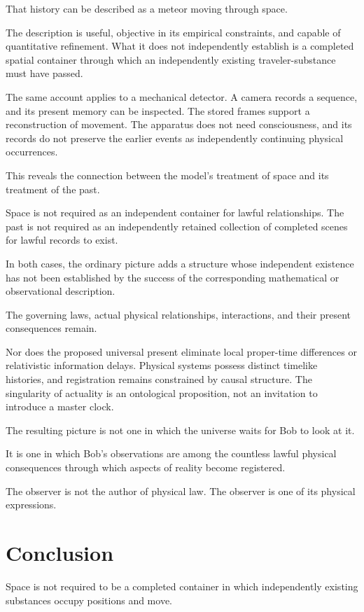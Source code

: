 \documentclass[12pt,onecolumn]{article}
\begin{document}
That history can be described as a meteor moving through space.

The description is useful, objective in its empirical constraints, and capable of quantitative refinement. What it does not independently establish is a completed spatial container through which an independently existing traveler-substance must have passed.

The same account applies to a mechanical detector. A camera records a sequence, and its present memory can be inspected. The stored frames support a reconstruction of movement. The apparatus does not need consciousness, and its records do not preserve the earlier events as independently continuing physical occurrences.

This reveals the connection between the model's treatment of space and its treatment of the past.

Space is not required as an independent container for lawful relationships. The past is not required as an independently retained collection of completed scenes for lawful records to exist.

In both cases, the ordinary picture adds a structure whose independent existence has not been established by the success of the corresponding mathematical or observational description.

The governing laws, actual physical relationships, interactions, and their present consequences remain.

Nor does the proposed universal present eliminate local proper-time differences or relativistic information delays. Physical systems possess distinct timelike histories, and registration remains constrained by causal structure. The singularity of actuality is an ontological proposition, not an invitation to introduce a master clock.

The resulting picture is not one in which the universe waits for Bob to look at it.

It is one in which Bob's observations are among the countless lawful physical consequences through which aspects of reality become registered.

The observer is not the author of physical law. The observer is one of its physical expressions.

\section{Conclusion}

Space is not required to be a completed container in which independently existing substances occupy positions and move.
\end{document}
